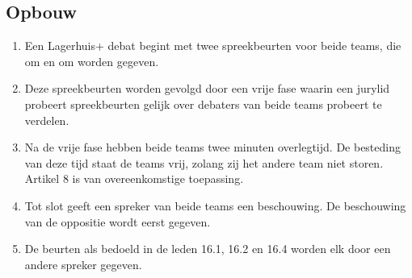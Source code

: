 \subsection{Opbouw}

\begin{enumerate}
\item Een Lagerhuis+ debat begint met twee spreekbeurten voor beide teams, die om en om worden gegeven.
\item Deze spreekbeurten worden gevolgd door een vrije fase waarin een jurylid probeert spreekbeurten gelijk over debaters van beide teams probeert te verdelen.
\item Na de vrije fase hebben beide teams twee minuten overlegtijd. De besteding van deze tijd staat de teams vrij, zolang zij het andere team niet storen. Artikel 8 is van overeenkomstige toepassing.
\item Tot slot geeft een spreker van beide teams een beschouwing. De beschouwing van de oppositie wordt eerst gegeven.
\item De beurten als bedoeld in de leden 16.1, 16.2 en 16.4 worden elk door een andere spreker gegeven.
\end{enumerate}
